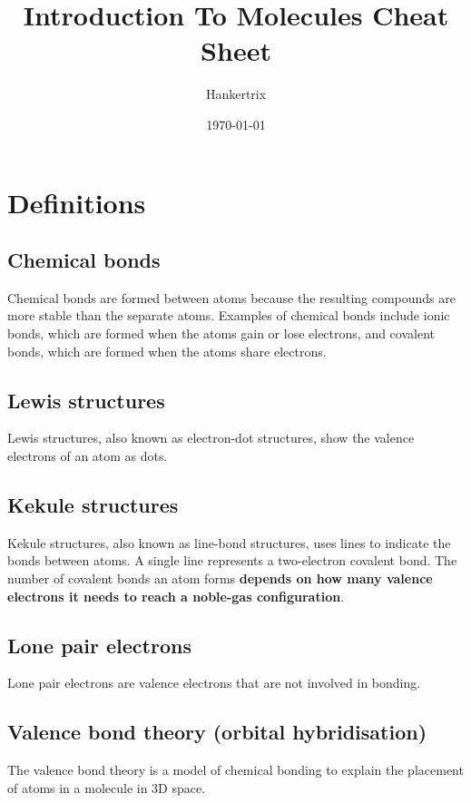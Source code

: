 \documentclass[11pt]{article}
\author{Hankertrix}
\date{\today}
\title{Introduction To Molecules Cheat Sheet}
\begin{document}
\maketitle
\setcounter{tocdepth}{2}
\tableofcontents

\newpage

\section{Definitions}
\label{sec:org8b69b34}

\subsection{Chemical bonds}
\label{sec:org3f61976}
Chemical bonds are formed between atoms because the resulting compounds are more stable than the separate atoms. Examples of chemical bonds include ionic bonds, which are formed when the atoms gain or lose electrons, and covalent bonds, which are formed when the atoms share electrons.

\subsection{Lewis structures}
\label{sec:org9a45cb9}
Lewis structures, also known as electron-dot structures, show the valence electrons of an atom as dots.

\subsection{Kekule structures}
\label{sec:org8f578ac}
Kekule structures, also known as line-bond structures, uses lines to indicate the bonds between atoms. A single line represents a two-electron covalent bond. The number of covalent bonds an atom forms \textbf{depends on how many valence electrons it needs to reach a noble-gas configuration}.

\subsection{Lone pair electrons}
\label{sec:org93c60bb}
Lone pair electrons are valence electrons that are not involved in bonding.

\subsection{Valence bond theory (orbital hybridisation)}
\label{sec:org30c170c}
The valence bond theory is a model of chemical bonding to explain the placement of atoms in a molecule in 3D space.
\end{document}
